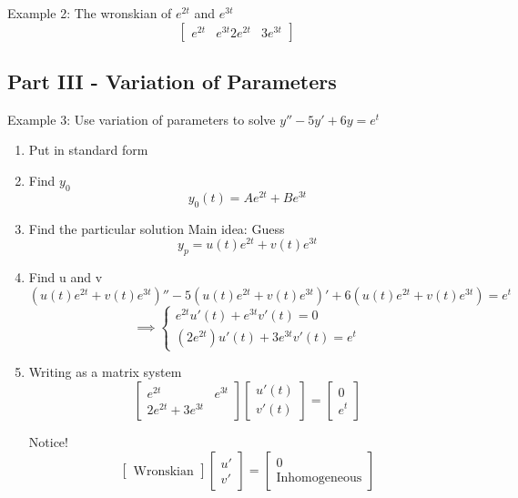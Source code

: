 \documentclass[12pt]{article}
\begin{document}
Example 2: The wronskian of $e^{2t}$ and $e^{3t}$
\[\begin{bmatrix}
    e^{2t} & e^{3t}
    2e^{2t} & 3e^{3t}
\end{bmatrix}\]

\subsection*{Part III - Variation of Parameters}
Example 3: Use variation of parameters to solve $y'' - 5y' + 6y = e^t$
\begin{enumerate}
    \item Put in standard form
    
    \item Find $y_0$
    \[y_0(t) = Ae^{2t} + Be^{3t}\]

    \item Find the particular solution 
    Main idea: Guess 
    \[y_p = u(t) e^{2t} + v(t) e^{3t}\]

    \item Find u and v 
    \[(u(t) e^{2t} + v(t) e^{3t})'' - 5(u(t) e^{2t} + v(t) e^{3t})' + 6(u(t) e^{2t} + v(t) e^{3t}) = e^t\]
    \[\implies \begin{cases}
        e^{2t} u'(t) + e^{3t} v'(t) = 0\\
        (2e^{2t}) u'(t) + 3e^{3t} v'(t) = e^t
    \end{cases}\]

    \item Writing as a matrix system 
    \[\begin{bmatrix}
        e^{2t} & e^{3t}\\
        2e^{2t} + 3e^{3t}
    \end{bmatrix} \begin{bmatrix}
        u'(t)\\
        v'(t)
    \end{bmatrix} = \begin{bmatrix}
        0\\
        e^t
    \end{bmatrix}\]

    Notice! 
    \[\begin{bmatrix}
        \text{Wronskian}
    \end{bmatrix} \begin{bmatrix}
        u'\\
        v'
    \end{bmatrix} = \begin{bmatrix}
        0 \\
        \text{Inhomogeneous}
    \end{bmatrix}\]


\end{enumerate}
\end{document}
